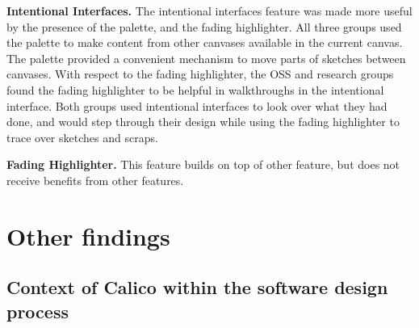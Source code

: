 \textbf{Intentional Interfaces.} The intentional interfaces feature was made more useful by the presence of the palette, and the fading highlighter. All three groups used the palette to make content from other canvases available in the current canvas. The palette provided a convenient mechanism to move parts of sketches between canvases. With respect to the fading highlighter, the OSS and research groups found the fading highlighter to be helpful in walkthroughs in the intentional interface. Both groups used intentional interfaces to look over what they had done, and would step through their design while using the fading highlighter to trace over sketches and scraps.

%
%

\textbf{Fading Highlighter.} This feature builds on top of other feature, but does not receive benefits from other features.

%
%
%



\section{Other findings}
\label{chapter:discussion:other-findings}

\subsection{Context of Calico within the software design process}


